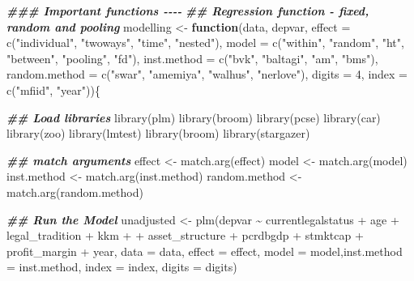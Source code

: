 \documentclass[a4paper,nobind]{templates/ociamthesis}
\newenvironment{Shaded}{\begin{snugshade}}{\end{snugshade}}
\newcommand{\AttributeTok}[1]{\textcolor[rgb]{0.77,0.63,0.00}{#1}}
\newcommand{\ControlFlowTok}[1]{\textcolor[rgb]{0.13,0.29,0.53}{\textbf{#1}}}
\newcommand{\DecValTok}[1]{\textcolor[rgb]{0.00,0.00,0.81}{#1}}
\newcommand{\DocumentationTok}[1]{\textcolor[rgb]{0.56,0.35,0.01}{\textbf{\textit{#1}}}}
\newcommand{\FunctionTok}[1]{\textcolor[rgb]{0.00,0.00,0.00}{#1}}
\newcommand{\NormalTok}[1]{#1}
\newcommand{\OtherTok}[1]{\textcolor[rgb]{0.56,0.35,0.01}{#1}}
\newcommand{\SpecialCharTok}[1]{\textcolor[rgb]{0.00,0.00,0.00}{#1}}
\newcommand{\StringTok}[1]{\textcolor[rgb]{0.31,0.60,0.02}{#1}}
\renewenvironment{Shaded}
{
  \vspace{10pt}%
  \begin{snugshade}%
}{%
  \end{snugshade}%
  \vspace{8pt}%
}
\begin{document}
\begin{Shaded}
\begin{Highlighting}[]
\DocumentationTok{\#\#\# Important functions {-}{-}{-}{-}}
\DocumentationTok{\#\# Regression function {-} fixed, random and pooling}
\NormalTok{modelling }\OtherTok{\textless{}{-}} \ControlFlowTok{function}\NormalTok{(data, depvar,}
                      \AttributeTok{effect =} \FunctionTok{c}\NormalTok{(}\StringTok{"individual"}\NormalTok{, }\StringTok{"twoways"}\NormalTok{, }\StringTok{"time"}\NormalTok{, }\StringTok{"nested"}\NormalTok{),}
                      \AttributeTok{model =} \FunctionTok{c}\NormalTok{(}\StringTok{"within"}\NormalTok{, }\StringTok{"random"}\NormalTok{, }\StringTok{"ht"}\NormalTok{, }\StringTok{"between"}\NormalTok{, }\StringTok{"pooling"}\NormalTok{, }\StringTok{"fd"}\NormalTok{),}
                      \AttributeTok{inst.method =} \FunctionTok{c}\NormalTok{(}\StringTok{"bvk"}\NormalTok{, }\StringTok{"baltagi"}\NormalTok{, }\StringTok{"am"}\NormalTok{, }\StringTok{"bms"}\NormalTok{),}
                      \AttributeTok{random.method =} \FunctionTok{c}\NormalTok{(}\StringTok{"swar"}\NormalTok{, }\StringTok{"amemiya"}\NormalTok{, }\StringTok{"walhus"}\NormalTok{, }\StringTok{"nerlove"}\NormalTok{),}
                      \AttributeTok{digits =} \DecValTok{4}\NormalTok{, }\AttributeTok{index =} \FunctionTok{c}\NormalTok{(}\StringTok{"mfiid"}\NormalTok{, }\StringTok{"year"}\NormalTok{))\{}
  
\DocumentationTok{\#\# Load libraries}
  \FunctionTok{library}\NormalTok{(plm)}
  \FunctionTok{library}\NormalTok{(broom)}
  \FunctionTok{library}\NormalTok{(pcse)}
  \FunctionTok{library}\NormalTok{(car)}
  \FunctionTok{library}\NormalTok{(zoo)}
  \FunctionTok{library}\NormalTok{(lmtest)}
  \FunctionTok{library}\NormalTok{(broom)}
  \FunctionTok{library}\NormalTok{(stargazer)}
  
  \DocumentationTok{\#\# match arguments}
\NormalTok{  effect }\OtherTok{\textless{}{-}} \FunctionTok{match.arg}\NormalTok{(effect)}
\NormalTok{  model }\OtherTok{\textless{}{-}} \FunctionTok{match.arg}\NormalTok{(model)}
\NormalTok{  inst.method }\OtherTok{\textless{}{-}} \FunctionTok{match.arg}\NormalTok{(inst.method)}
\NormalTok{  random.method }\OtherTok{\textless{}{-}} \FunctionTok{match.arg}\NormalTok{(random.method)}
  
  \DocumentationTok{\#\# Run the Model}
\NormalTok{  unadjusted }\OtherTok{\textless{}{-}} \FunctionTok{plm}\NormalTok{(depvar }\SpecialCharTok{\textasciitilde{}}\NormalTok{ currentlegalstatus }\SpecialCharTok{+} 
\NormalTok{            age }\SpecialCharTok{+}\NormalTok{ legal\_tradition }\SpecialCharTok{+}\NormalTok{ kkm }\SpecialCharTok{+}
\SpecialCharTok{+}\NormalTok{           asset\_structure }\SpecialCharTok{+}\NormalTok{ pcrdbgdp }\SpecialCharTok{+}\NormalTok{ stmktcap }\SpecialCharTok{+}
\NormalTok{            profit\_margin }\SpecialCharTok{+}\NormalTok{ year, }
          \AttributeTok{data =}\NormalTok{ data, }\AttributeTok{effect =}\NormalTok{ effect,}
          \AttributeTok{model =}\NormalTok{ model,}\AttributeTok{inst.method =}\NormalTok{ inst.method, }
          \AttributeTok{index =}\NormalTok{ index, }
          \AttributeTok{digits =}\NormalTok{ digits)}


\end{Highlighting}
\end{Shaded}
\end{document}
